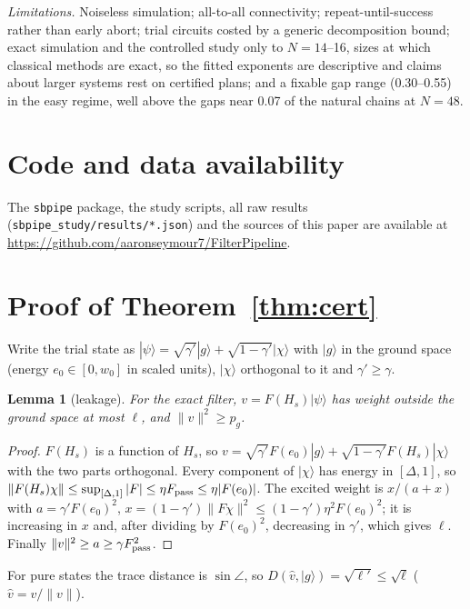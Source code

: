 \documentclass[aps,pra,twocolumn,superscriptaddress,nofootinbib]{revtex4-2}
\newtheorem{lemma}{Lemma}
\newcommand{\ket}[1]{|#1\rangle}
\newcommand{\norm}[1]{\lVert#1\rVert}
\begin{document}
\emph{Limitations.} Noiseless simulation; all-to-all connectivity; repeat-until-success rather than early abort;
trial circuits costed by a generic decomposition bound; exact simulation and the controlled study only to
$N=14$--16, sizes at which classical methods are exact, so the fitted exponents are descriptive and claims about
larger systems rest on certified plans; and a fixable gap range (0.30--0.55) in the easy regime, well above the
gaps near 0.07 of the natural chains at $N=48$.

\section*{Code and data availability}
The \texttt{sbpipe} package, the study scripts, all raw results (\texttt{sbpipe\_study/results/*.json}) and
the sources of this paper are available at \url{https://github.com/aaronseymour7/FilterPipeline}.

\appendix

\section{Proof of Theorem~\ref{thm:cert}}
\label{app:proof}

Write the trial state as $\ket\psi=\sqrt{\gamma'}\ket g+\sqrt{1-\gamma'}\ket\chi$ with $\ket g$ in the
ground space (energy $e_0\in[0,w_0]$ in scaled units), $\ket\chi$ orthogonal to it and $\gamma'\ge\gamma$.

\begin{lemma}[leakage]\label{lem:leak}
For the exact filter, $v=F(H_s)\ket\psi$ has weight outside the ground space at most $\ell$, and
$\norm v^2\ge p_g$.
\end{lemma}
\begin{proof}
$F(H_s)$ is a function of $H_s$, so $v=\sqrt{\gamma'}F(e_0)\ket g+\sqrt{1-\gamma'}F(H_s)\ket\chi$ with
the two parts orthogonal. Every component of $\ket\chi$ has energy in $[\Delta,1]$, so
$\norm{F(H_s)\chi}\le\sup_{[\Delta,1]}|F|\le\eta F_{\rm pass}\le\eta|F(e_0)|$. The excited weight is
$x/(a+x)$ with $a=\gamma'F(e_0)^2$, $x=(1-\gamma')\norm{F\chi}^2\le(1-\gamma')\eta^2F(e_0)^2$; it is
increasing in $x$ and, after dividing by $F(e_0)^2$, decreasing in $\gamma'$, which gives $\ell$.
Finally $\norm v^2\ge a\ge\gamma F_{\rm pass}^2$.
\end{proof}

For pure states the trace distance is $\sin\angle$, so $D(\hat v,\ket g)=\sqrt{\ell'}\le\sqrt\ell$
($\hat v=v/\norm v$).
\end{document}
